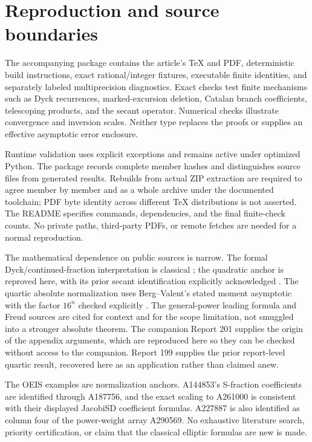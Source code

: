 \documentclass[11pt,letterpaper]{article}
\numberwithin{equation}{section}
\theoremstyle{remark}\newtheorem{remark}[theorem]{Remark}
\begin{document}
\section{Reproduction and source boundaries}\label{pwd:rc:sec:repro}
The accompanying package contains the article's TeX and PDF, deterministic build instructions, exact rational/integer fixtures, executable finite identities, and separately labeled multiprecision diagnostics. Exact checks test finite mechanisms such as Dyck recurrences, marked-excursion deletion, Catalan branch coefficients, telescoping products, and the secant operator. Numerical checks illustrate convergence and inversion scales. Neither type replaces the proofs or supplies an effective asymptotic error enclosure.

Runtime validation uses explicit exceptions and remains active under optimized Python. The package records complete member hashes and distinguishes source files from generated results. Rebuilds from actual ZIP extraction are required to agree member by member and as a whole archive under the documented toolchain; PDF byte identity across different TeX distributions is not asserted. The README specifies commands, dependencies, and the final finite-check counts. No private paths, third-party PDFs, or remote fetches are needed for a normal reproduction.

The mathematical dependence on public sources is narrow. The formal Dyck/continued-fraction interpretation is classical \cite{flajolet}; the quadratic anchor is reproved here, with its prior secant identification explicitly acknowledged \cite{debsokal}. The quartic absolute normalization uses Berg--Valent's stated moment asymptotic with the factor $16^n$ checked explicitly \cite{bergvalent}. The general-power leading formula and Freud sources are cited for context and for the scope limitation, not smuggled into a stronger absolute theorem. The companion Report 201 supplies the origin of the appendix arguments, which are reproduced here so they can be checked without access to the companion. Report 199 supplies the prior report-level quartic result, recovered here as an application rather than claimed anew.

The OEIS examples are normalization anchors. A144853's S-fraction coefficients are identified through A187756, and the exact scaling to A261000 is consistent with their displayed JacobiSD coefficient formulas. A227887 is also identified as column four of the power-weight array A290569. No exhaustive literature search, priority certification, or claim that the classical elliptic formulas are new is made.
\end{document}
